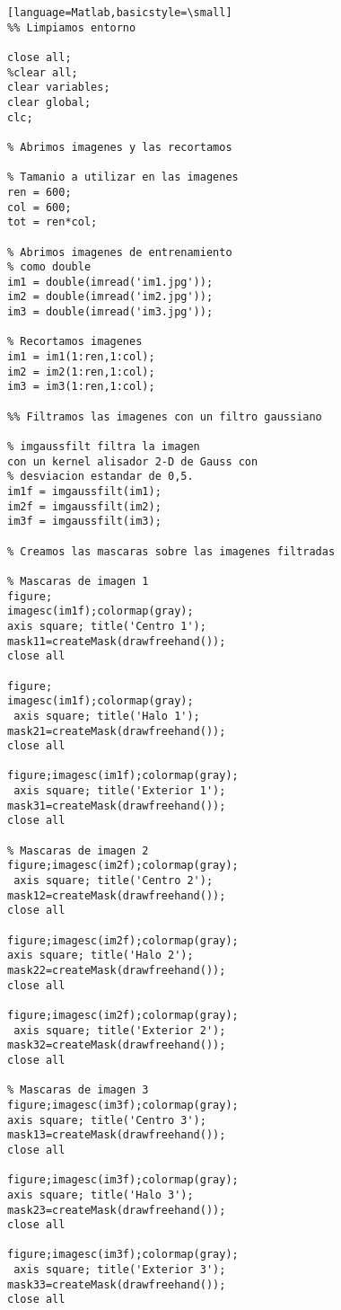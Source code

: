 \documentclass[10pt,journal,compsoc]{IEEEtran}\usepackage[T1]{fontenc}                              %
\begin{document}
\begin{lstlisting}
[language=Matlab,basicstyle=\small]
%% Limpiamos entorno

close all;
%clear all;
clear variables;
clear global;
clc;

% Abrimos imagenes y las recortamos 

% Tamanio a utilizar en las imagenes
ren = 600;
col = 600;
tot = ren*col;

% Abrimos imagenes de entrenamiento 
% como double
im1 = double(imread('im1.jpg'));
im2 = double(imread('im2.jpg'));
im3 = double(imread('im3.jpg'));

% Recortamos imagenes
im1 = im1(1:ren,1:col);
im2 = im2(1:ren,1:col);
im3 = im3(1:ren,1:col);

%% Filtramos las imagenes con un filtro gaussiano

% imgaussfilt filtra la imagen 
con un kernel alisador 2-D de Gauss con
% desviacion estandar de 0,5.
im1f = imgaussfilt(im1);
im2f = imgaussfilt(im2);
im3f = imgaussfilt(im3);

% Creamos las mascaras sobre las imagenes filtradas

% Mascaras de imagen 1
figure;
imagesc(im1f);colormap(gray); 
axis square; title('Centro 1');
mask11=createMask(drawfreehand());
close all

figure;
imagesc(im1f);colormap(gray);
 axis square; title('Halo 1');
mask21=createMask(drawfreehand());
close all

figure;imagesc(im1f);colormap(gray);
 axis square; title('Exterior 1');
mask31=createMask(drawfreehand());
close all

% Mascaras de imagen 2
figure;imagesc(im2f);colormap(gray);
 axis square; title('Centro 2');
mask12=createMask(drawfreehand());
close all

figure;imagesc(im2f);colormap(gray);
axis square; title('Halo 2');
mask22=createMask(drawfreehand());
close all

figure;imagesc(im2f);colormap(gray);
 axis square; title('Exterior 2');
mask32=createMask(drawfreehand());
close all

% Mascaras de imagen 3
figure;imagesc(im3f);colormap(gray);
axis square; title('Centro 3');
mask13=createMask(drawfreehand());
close all

figure;imagesc(im3f);colormap(gray); 
axis square; title('Halo 3');
mask23=createMask(drawfreehand());
close all

figure;imagesc(im3f);colormap(gray);
 axis square; title('Exterior 3');
mask33=createMask(drawfreehand());
close all


\end{lstlisting}
\end{document}
